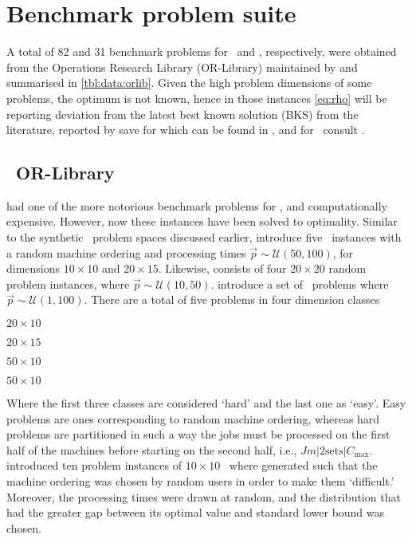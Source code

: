 \section{Benchmark problem suite}\label{sec:data:orlib}
A total of 82 and 31 benchmark problems for \JSP\ and \FSP, respectively, were 
obtained from the Operations Research Library (OR-Library) maintained by 
\citet{ORlibrary} and summarised in \cref{tbl:data:orlib}. 
Given the high problem dimensions of some problems, the optimum is not known, 
hence in those instances \cref{eq:rho} will be reporting  deviation from the 
latest best known solution (BKS) from the literature, reported by 
\citet{orlibJSP} save for  which can be found 
in \citet{Jain99}, and for \FSP\  consult \citet{orlibFSP}.

\subsection*{\Jsp\ OR-Library}
\citet{orlib_ft} had one of the more notorious benchmark problems for \JSP, and 
computationally expensive. However, now these instances have been solved to 
optimality. 
Similar to the synthetic \JSP\ problem spaces discussed earlier, 
\citet{orlib_abz} introduce five \JSP\ instances with a random machine ordering 
and processing times $\vec{p}\sim\mathcal{U}(50,100)$, for  dimensions 
$10\times10$ and $20\times15$. 
Likewise, \citet{orlib_yn} consists of four $20\times20$ random 
problem instances, where $\vec{p}\sim\mathcal{U}(10,50)$.
\citet{orlib_swv} introduce a set of \JSP\ problems where 
$\vec{p}\sim\mathcal{U}(1,100)$. There are a total of five problems in four 
dimension classes 
\begin{enumerate*}
  \item $20\times10$ %
  \item $20\times15$ %
  \item $50\times10$ %
  \item $50\times10$ %
\end{enumerate*}
Where the first three classes are considered `{hard}' and the last one as 
`{easy}'. Easy problems are ones corresponding to random machine ordering, 
whereas hard problems are partitioned in such a way the jobs must be processed 
on the first half of the machines before starting on the second half, i.e., 
$Jm|\text{2sets}|C_{\max}$.
\citet{orlib_orb} introduced ten problem instances of $10\times10$ \JSP\ where 
generated such that the machine ordering was chosen by random users in order to 
make them `difficult.' Moreover, the processing times were drawn at random, 
and the distribution that had the greater gap between its optimal value and 
standard lower bound was chosen. 

